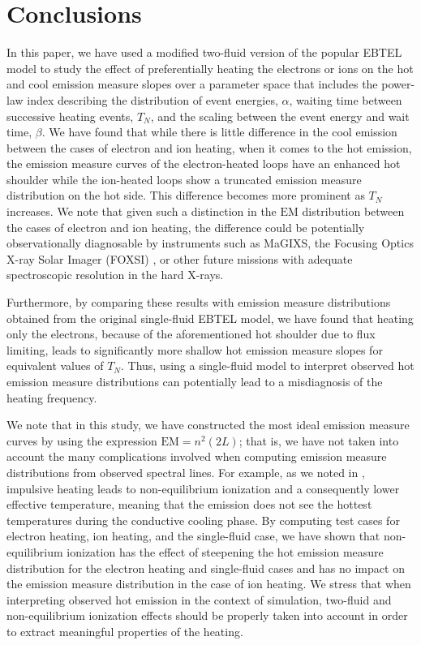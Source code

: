 \documentclass[apj]{emulateapj}
\begin{document}
	\section{Conclusions}
	\label{sec:conclusions}
	\par In this paper, we have used a modified two-fluid version of the popular EBTEL model to study the effect of preferentially heating the electrons or ions on the hot and cool emission measure slopes over a parameter space that includes the power-law index describing the distribution of event energies, $\alpha$, waiting time between successive heating events, $T_N$, and the scaling between the event energy and wait time, $\beta$. We have found that while there is little difference in the cool emission between the cases of electron and ion heating, when it comes to the hot emission, the emission measure curves of the electron-heated loops have an enhanced hot shoulder while the ion-heated loops show a truncated emission measure distribution on the hot side. This difference becomes more prominent as $T_N$ increases. We note that given such a distinction in the $\mathrm{EM}$ distribution between the cases of electron and ion heating, the difference could be potentially observationally diagnosable by instruments such as MaGIXS, the Focusing Optics X-ray Solar Imager (FOXSI) \citep{krucker_focusing_2011}, or other future missions with adequate spectroscopic resolution in the hard X-rays.
	\par Furthermore, by comparing these results with emission measure distributions obtained from the original single-fluid EBTEL model, we have found that heating only the electrons, because of the aforementioned hot shoulder due to flux limiting, leads to significantly more shallow hot emission measure slopes for equivalent values of $T_N$. Thus, using a single-fluid model to interpret observed hot emission measure distributions can potentially lead to a misdiagnosis of the heating frequency.
	\par We note that in this study, we have constructed the most ideal emission measure curves by using the expression $\mathrm{EM}=n^2(2L)$; that is, we have not taken into account the many complications involved when computing emission measure distributions from observed spectral lines. For example, as we noted in , impulsive heating leads to non-equilibrium ionization and a consequently lower effective temperature, meaning that the emission does not see the hottest temperatures during the conductive cooling phase. By computing test cases for electron heating, ion heating, and the single-fluid case, we have shown that non-equilibrium ionization has the effect of steepening the hot emission measure distribution for the electron heating and single-fluid cases and has no impact on the emission measure distribution in the case of ion heating. We stress that when interpreting observed hot emission in the context of simulation, two-fluid and non-equilibrium ionization effects should be properly taken into account in order to extract meaningful properties of the heating.
\end{document}
